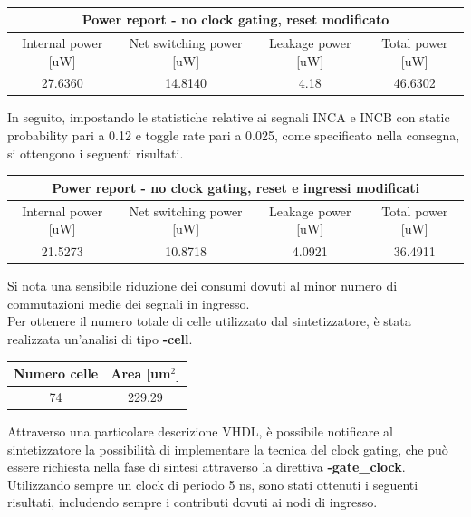 \documentclass[11pt,  english, makeidx, a4paper, titlepage, oneside]{book}
\begin{document}
\\
\begin{center}
	\begin{tabular}{|c|c|c|c|}
	\hline
	\multicolumn{4}{c}{Power report - no clock gating, reset modificato}\\
	\hline
	Internal power [uW] & Net switching power [uW] & Leakage power [uW] & Total power [uW] \\
	\hline
	 27.6360 & 14.8140  & 4.18  &  46.6302 \\
	\hline
	\end{tabular}	
\end{center}
\vspace{0.3cm}
In seguito, impostando le statistiche relative ai segnali INCA e INCB con static probability pari a 0.12 e toggle rate pari a 0.025, come specificato nella consegna, si ottengono i seguenti risultati.
\\
\begin{center}
	\begin{tabular}{|c|c|c|c|}
	\hline
	\multicolumn{4}{c}{Power report - no clock gating, reset e ingressi modificati}\\
	\hline
	Internal power [uW] & Net switching power [uW] & Leakage power [uW] & Total power [uW] \\
	\hline
	21.5273 & 10.8718  & 4.0921  &  36.4911 \\
	\hline
	\end{tabular}	
\end{center}
\vspace{0.3cm}
Si nota una sensibile riduzione dei consumi dovuti al minor numero di commutazioni medie dei segnali in ingresso.\\
Per ottenere il numero totale di celle utilizzato dal sintetizzatore, è stata realizzata un'analisi di tipo \textbf{-cell}.
\\
\begin{center}
	\begin{tabular}{|c|c|}
	\hline
	Numero celle & Area [um$^2$] \\
	\hline
	 74 & 229.29 \\
	\hline
	\end{tabular}	
\end{center}
\vspace{0.3cm}
Attraverso una particolare descrizione VHDL, è possibile notificare al sintetizzatore la possibilità di implementare la tecnica del clock gating, che può essere richiesta nella fase di sintesi attraverso la direttiva \textbf{-gate\_clock}.
Utilizzando sempre un clock di periodo 5 ns, sono stati ottenuti i seguenti risultati, includendo sempre i contributi dovuti ai nodi di ingresso.       
\end{document}
